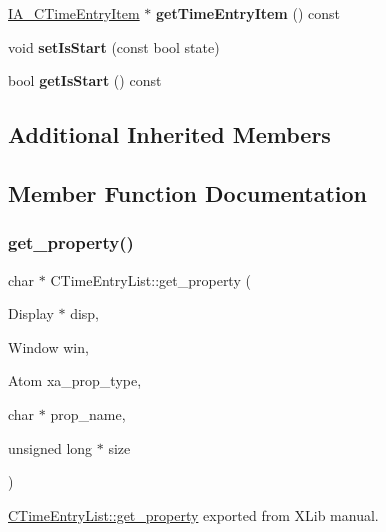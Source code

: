 \begin{DoxyCompactItemize}
\item 
\mbox{\label{classCTimeEntryList_ae39f48902c6a22a5960062b458a1fc60}} 
\hyperlink{classIA__CTimeEntryItem}{I\+A\+\_\+\+C\+Time\+Entry\+Item} $\ast$ {\bfseries get\+Time\+Entry\+Item} () const
\item 
\mbox{\label{classCTimeEntryList_aeeacf317fd0a0f46352245804600a0a6}} 
void {\bfseries set\+Is\+Start} (const bool state)
\item 
\mbox{\label{classCTimeEntryList_a10d04894e9dce55472b1c29f38cbd664}} 
bool {\bfseries get\+Is\+Start} () const
\end{DoxyCompactItemize}
\subsection*{Additional Inherited Members}


\subsection{Member Function Documentation}
\mbox{\label{classCTimeEntryList_a3c69293ae26634d1889e0bd8730926ae}} 
\subsubsection{\texorpdfstring{get\+\_\+property()}{get\_property()}}
{\footnotesize\ttfamily char $\ast$ C\+Time\+Entry\+List\+::get\+\_\+property (\begin{DoxyParamCaption}\item[{Display $\ast$}]{disp,  }\item[{Window}]{win,  }\item[{Atom}]{xa\+\_\+prop\+\_\+type,  }\item[{char $\ast$}]{prop\+\_\+name,  }\item[{unsigned long $\ast$}]{size }\end{DoxyParamCaption})\hspace{0.3cm}{\ttfamily [virtual]}}



\hyperlink{classCTimeEntryList_a3c69293ae26634d1889e0bd8730926ae}{C\+Time\+Entry\+List\+::get\+\_\+property} exported from X\+Lib manual. 


